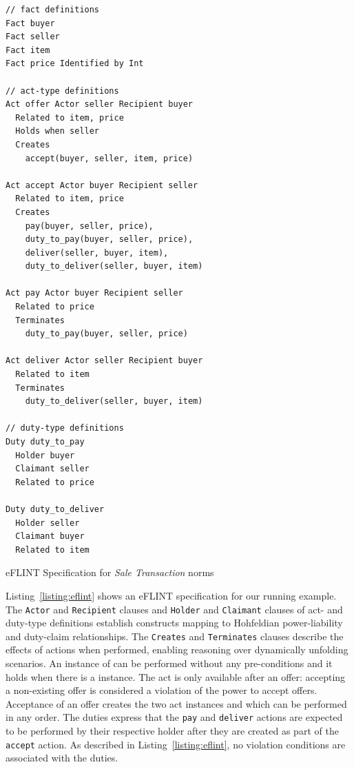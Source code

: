 %
\begin{listing}[!ht]
  \centering
\begin{minipage}{1\textwidth}
  \centering
\begin{tcolorbox}[left=2pt,right=2pt,top=2pt,bottom=2pt]
\begin{verbatim}
// fact definitions
Fact buyer 
Fact seller
Fact item
Fact price Identified by Int 

// act-type definitions
Act offer Actor seller Recipient buyer
  Related to item, price
  Holds when seller
  Creates 
    accept(buyer, seller, item, price)

Act accept Actor buyer Recipient seller
  Related to item, price
  Creates 
    pay(buyer, seller, price),
    duty_to_pay(buyer, seller, price),
    deliver(seller, buyer, item),
    duty_to_deliver(seller, buyer, item)

Act pay Actor buyer Recipient seller
  Related to price
  Terminates 
    duty_to_pay(buyer, seller, price)

Act deliver Actor seller Recipient buyer
  Related to item
  Terminates
    duty_to_deliver(seller, buyer, item)

// duty-type definitions
Duty duty_to_pay 
  Holder buyer
  Claimant seller
  Related to price

Duty duty_to_deliver
  Holder seller
  Claimant buyer
  Related to item
\end{verbatim}
\end{tcolorbox}
\end{minipage}%
\caption{eFLINT Specification for \textit{Sale Transaction} norms}
\label{listing:eflint}
\end{listing}


%
Listing~\ref{listing:eflint} shows an eFLINT specification for our running example.
%
The \texttt{Actor} and \texttt{Recipient} clauses and \texttt{Holder} and \texttt{Claimant} clauses of act- and duty-type definitions establish constructs mapping to Hohfeldian power-liability and duty-claim relationships.
%
The \texttt{Creates} and \texttt{Terminates} clauses describe the effects of actions when performed, enabling reasoning over dynamically unfolding scenarios.
%
An instance of  can be performed without any pre-conditions and it holds when there is a  instance. 
%
The act  is only available after an offer: accepting a non-existing offer is considered a violation of the power to accept offers.
%
Acceptance of an offer creates the two act instances  and  which can be performed in any order.
%
The duties express that the \texttt{pay} and \texttt{deliver} actions are expected to be performed by their respective holder after they are created as part of the \texttt{accept} action.
%
As described in Listing~\ref{listing:eflint}, no violation conditions are associated with the duties.
%

